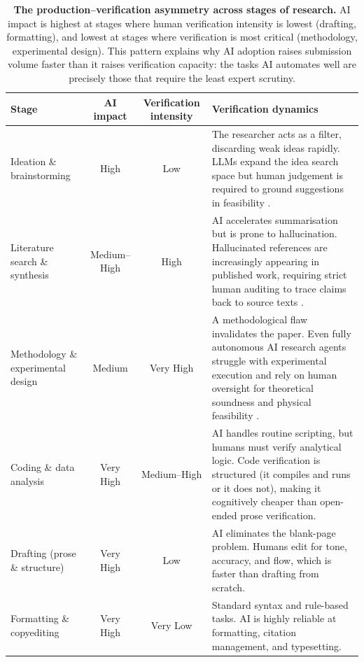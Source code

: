 \documentclass{article}
\begin{document}
\begin{table}[H]
  \centering
  \footnotesize
  \caption{\textbf{The production--verification asymmetry across stages of research.}
    AI impact is highest at stages where human verification intensity is lowest (drafting, formatting), and lowest at stages where verification is most critical (methodology, experimental design).
    This pattern explains why AI adoption raises submission volume faster than it raises verification capacity: the tasks AI automates well are precisely those that require the least expert scrutiny.}
  \label{tab:stage_asymmetry}
  \renewcommand{\arraystretch}{1.4}
  \begin{tabularx}{\textwidth}{p{2.8cm} c c X}
    \toprule
    \textbf{Stage} & \textbf{AI impact} & \textbf{Verification intensity} & \textbf{Verification dynamics} \\
    \midrule
    Ideation \& brainstorming
      & High & Low
      & The researcher acts as a filter, discarding weak ideas rapidly.
        LLMs expand the idea search space but human judgement is required to ground suggestions in feasibility \citep{Si2024, Lu2024}. \\
    Literature search \& synthesis
      & Medium--High & High
      & AI accelerates summarisation but is prone to hallucination.
        Hallucinated references are increasingly appearing in published work, requiring strict human auditing to trace claims back to source texts \citep{HalluCitations2026, Dahl2024}. \\
    Methodology \& experimental design
      & Medium & Very High
      & A methodological flaw invalidates the paper.
        Even fully autonomous AI research agents struggle with experimental execution and rely on human oversight for theoretical soundness and physical feasibility \citep{Lu2024}. \\
    Coding \& data analysis
      & Very High & Medium--High
      & AI handles routine scripting, but humans must verify analytical logic.
        Code verification is structured (it compiles and runs or it does not), making it cognitively cheaper than open-ended prose verification. \\
    Drafting (prose \& structure)
      & Very High & Low
      & AI eliminates the blank-page problem.
        Humans edit for tone, accuracy, and flow, which is faster than drafting from scratch. \\
    Formatting \& copyediting
      & Very High & Very Low
      & Standard syntax and rule-based tasks.
        AI is highly reliable at formatting, citation management, and typesetting. \\
    \bottomrule
  \end{tabularx}
\end{table}


\clearpage



\end{document}

